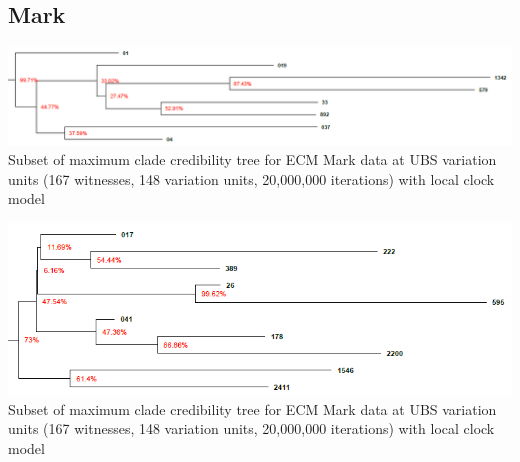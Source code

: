 \documentclass[10pt]{beamer}
\begin{document}
	\subsection{Mark}
	\begin{frame}
		\begin{center}
			\includegraphics[width=\textwidth]{../img/ecm_mark_local_max_clade_credibility_tree_a_text.png}\\
			Subset of maximum clade credibility tree for ECM Mark data at UBS variation units (167 witnesses, 148 variation units, 20,000,000 iterations) with local clock model\\
		\end{center}
	\end{frame}
	\begin{frame}
		\begin{center}
			\includegraphics[width=\textwidth]{../img/ecm_mark_local_max_clade_credibility_tree_family_041.png}\\
			Subset of maximum clade credibility tree for ECM Mark data at UBS variation units (167 witnesses, 148 variation units, 20,000,000 iterations) with local clock model\\
		\end{center}
	\end{frame}
\end{document}
